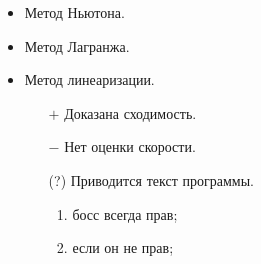 \documentclass[14pt]{report}
\author{Group 09-218}
\begin{document}
	\newpage
	\begin{itemize}
		\item Метод Ньютона.
		\item Метод Лагранжа.
		\item Метод линеаризации.
		\begin{itemize}
			\item[$+$] Доказана сходимость.
			\item[$-$] Нет оценки скорости.
			\item[(?)] Приводится текст программы.
			\renewcommand{\theenumi}{(\asbuk{enumi})}
			\begin{enumerate}
				\item\label{boss} босс всегда прав;
				\item если он не прав;
			\end{enumerate}
		\end{itemize}
	\end{itemize}
\end{document}
